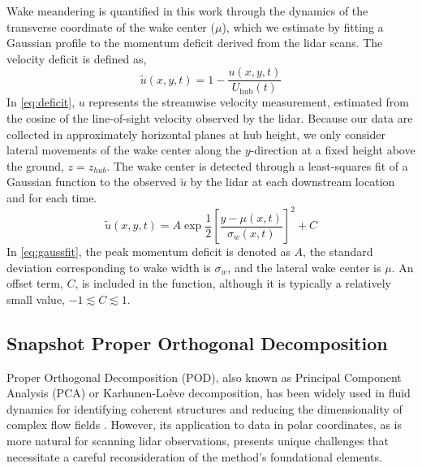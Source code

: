\documentclass[%
 aip,
 amsmath,
 amssymb,
]{revtex4-2}
\begin{document}
Wake meandering is quantified in this work through the dynamics of the transverse coordinate of the wake center ($\mu$), which we estimate by fitting a Gaussian profile to the momentum deficit derived from the lidar scans. 
The velocity deficit is defined as,
\begin{equation}
    \tilde{u}(x,y,t) = 1 - \frac{u(x,y,t)}{U_\text{hub}(t)}
    \label{eq:deficit}
\end{equation}
In \cref{eq:deficit}, $u$ represents the streamwise velocity measurement, estimated from the cosine of the line-of-sight velocity observed by the lidar. 
Because our data are collected in approximately horizontal planes at hub height, we only consider lateral movements of the wake center along the $y$-direction at a fixed height above the ground, $z=z_{hub}$.
The wake center is detected through a least-squares fit of a Gaussian function to the observed $\tilde{u}$ by the lidar at each downstream location and for each time.
\begin{equation}
  \tilde{u}(x,y,t) = A \exp{\frac{1}{2}\left[ \frac{y-\mu(x,t)}{\sigma_w(x,t)}\right]^2} + C
  \label{eq:gaussfit}
\end{equation}
In \cref{eq:gaussfit}, the peak momentum deficit is denoted as $A$, the standard deviation corresponding to wake width is $\sigma_w$, and the lateral wake center is $\mu$.
An offset term, $C$, is included in the function, although it is typically a relatively small value, $-1 \lesssim C \lesssim 1$. 


\subsection{Snapshot Proper Orthogonal Decomposition}
\label{sec:POD}

Proper Orthogonal Decomposition (POD), also known as Principal Component Analysis (PCA) or Karhunen-Loève decomposition, has been widely used in fluid dynamics for identifying coherent structures and reducing the dimensionality of complex flow fields \cite{berkooz_proper_1993}. 
However, its application to data in polar coordinates, as is more natural for scanning lidar observations, presents unique challenges that necessitate a careful reconsideration of the method's foundational elements.
\end{document}
